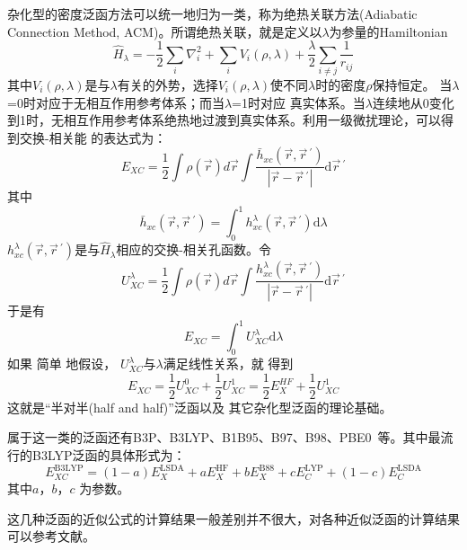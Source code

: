 杂化型的密度泛函方法可以统一地归为一类，称为绝热关联方法\textrm{(Adiabatic Connection Method, ACM)}。所谓绝热关联，就是定义以$\lambda$为参量的Hamiltonian
\begin{equation}
  \hat H_{\lambda}=-\dfrac12\sum_i\nabla_i^2+\sum_iV_i(\rho,\lambda)+\dfrac{\lambda}2\sum_{i\neq j}\dfrac1{r_{ij}}
  \label{eq:dft-27}
\end{equation}
其中$V_i(\rho,\lambda)$是与$\lambda$有关的外势，选择$V_i(\rho,\lambda)$使不同$\lambda$时的密度$\rho$保持恒定。%
当$\lambda$=0时对应于无相互作用参考体系；而当$\lambda$=1时对应%
真实体系。当$\lambda$连续地从0变化到1时，无相互作用参考体系绝热地过渡到真实体系。利用一级微扰理论，可以得到交换-相关能%
{的}表达式为：
$$E_{XC}=\dfrac12\int\rho(\vec r)d\vec r\int\dfrac{\bar h_{xc}(\vec r,\vec r\,^{\prime})}{|\vec r-\vec r\,^{\prime}|}\textrm{d}\vec r\,^{\prime}$$
其中$$\bar h_{xc}(\vec r,\vec r\,^{\prime})=\int_0^1h_{xc}^{\lambda}(\vec r,\vec r\,^{\prime})\textrm{d}\lambda$$
$h_{xc}^{\lambda}(\vec r,\vec r\,^{\prime})$是与$\hat H_{\lambda}$相应的交换-相关孔函数。令
$$U_{XC}^{\lambda}=\dfrac12\int\rho(\vec r)d\vec r\int\dfrac{h_{xc}^{\lambda}(\vec r,\vec r\,^{\prime})}{|\vec r-\vec r\,^{\prime}|}\textrm{d}\vec r\,^{\prime}$$
于是有$$E_{XC}=\int_0^1U_{XC}^{\lambda}\textrm{d}\lambda$$
如果%
简单%
{地}假设，%
$U_{XC}^{\lambda}$与$\lambda$满足线性关系，就%
得到
$$E_{XC}=\dfrac12U_{XC}^0+\dfrac12U_{XC}^1=\dfrac12E_X^{HF}+\dfrac12U_{XC}^1$$
这就是“半对半(half and half)”泛函以及%
{其它}杂化型泛函的理论基础。

属于这一类的泛函还有B3P、B3LYP、B1B95、B97、B98、PBE0~等。其中最流行的B3LYP泛函的具体形式为：
$$E_{XC}^{\mathrm{B3LYP}}=(1-a)E_X^{\mathrm{LSDA}}+aE_X^{\mathrm{HF}}+bE_X^{\mathrm{B88}}+cE_C^{\mathrm{LYP}}+(1-c)E_C^{\mathrm{LSDA}}$$
其中$a$，$b$，$c$%
为参数。

这几种泛函的近似公式的计算结果{一般}差别并不很大，对各种近似泛函的计算结果可以参考文献。

